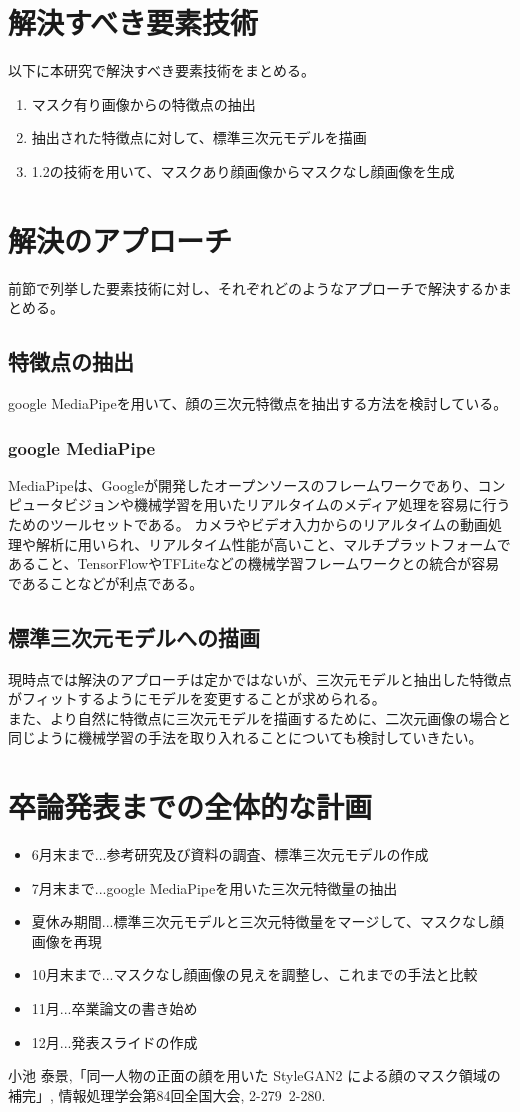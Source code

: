 \documentclass[]{jarticle}          %
\begin{document}
\section{解決すべき要素技術}
以下に本研究で解決すべき要素技術をまとめる。
\begin{enumerate}
  \item マスク有り画像からの特徴点の抽出
  \item 抽出された特徴点に対して、標準三次元モデルを描画
  \item 1.2の技術を用いて、マスクあり顔画像からマスクなし顔画像を生成
\end{enumerate}

\section{解決のアプローチ}
前節で列挙した要素技術に対し、それぞれどのようなアプローチで解決するかまとめる。
\subsection{特徴点の抽出}
google MediaPipeを用いて、顔の三次元特徴点を抽出する方法を検討している。
\subsubsection{google MediaPipe}
MediaPipeは、Googleが開発したオープンソースのフレームワークであり、コンピュータビジョンや機械学習を用いたリアルタイムのメディア処理を容易に行うためのツールセットである。
カメラやビデオ入力からのリアルタイムの動画処理や解析に用いられ、リアルタイム性能が高いこと、マルチプラットフォームであること、TensorFlowやTFLiteなどの機械学習フレームワークとの統合が容易であることなどが利点である。
\subsection{標準三次元モデルへの描画}
現時点では解決のアプローチは定かではないが、三次元モデルと抽出した特徴点がフィットするようにモデルを変更することが求められる。 \\
また、より自然に特徴点に三次元モデルを描画するために、二次元画像の場合と同じように\cite{bib_1}機械学習の手法を取り入れることについても検討していきたい。

\section{卒論発表までの全体的な計画}
\begin{itemize}
  \item 6月末まで...参考研究及び資料の調査、標準三次元モデルの作成
  \item 7月末まで...google MediaPipeを用いた三次元特徴量の抽出
  \item 夏休み期間...標準三次元モデルと三次元特徴量をマージして、マスクなし顔画像を再現
  \item 10月末まで...マスクなし顔画像の見えを調整し、これまでの手法と比較
  \item 11月...卒業論文の書き始め
  \item 12月...発表スライドの作成
\end{itemize}

\begin{thebibliography}{99}
 小池 泰景,「同一人物の正面の顔を用いた StyleGAN2 による顔のマスク領域の補完」, 情報処理学会第84回全国大会, 2-279~2-280.
\end{thebibliography}
\end{document}
